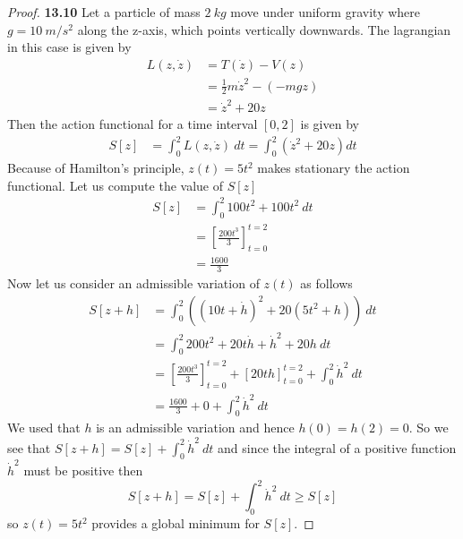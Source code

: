 \documentclass[11pt]{article}
\theoremstyle{definition}
\begin{document}
\begin{proof}{\textbf{13.10}}
    Let a particle of mass $2~kg$ move under uniform gravity where
    $g = 10~m/s^2$ along the z-axis, which points vertically downwards.
    The lagrangian in this case is given by
    \begin{align*}
        L(z, \dot{z}) &= T(\dot{z}) - V(z)\\
            &= \frac{1}{2}m\dot{z}^2 - (- mgz)\\
            &= \dot{z}^2 + 20z
    \end{align*}
    Then the action functional for a time interval $[0,2]$ is given by
    \begin{align*}
        S[z] &= \int_0^2 L(z, \dot{z})~dt
            = \int_0^2 (\dot{z}^2 + 20z) dt
    \end{align*}
    Because of Hamilton's principle, $z(t) = 5t^2$ makes stationary the
    action functional. Let us compute the value of $S[z]$
    \begin{align*}
        S[z] &= \int_0^2 100t^2 + 100t^2~dt\\
            &= \left[\frac{200t^3}{3}\right]_{t=0}^{t=2}\\
            &= \frac{1600}{3}
    \end{align*}
    Now let us consider an admissible variation of $z(t)$ as follows
    \begin{align*}
        S[z + h] &= \int_0^2 ((10t + \dot h)^2 + 20(5t^2 + h))~dt\\
            &= \int_0^2 200t^2 + 20t\dot h + \dot h^2 + 20h~dt\\
            &= \left[\frac{200t^3}{3}\right]_{t=0}^{t=2}
            + [20th]_{t=0}^{t=2} + \int_0^2 \dot h^2~dt\\
            &= \frac{1600}{3} + 0 + \int_0^2 \dot h^2~dt
    \end{align*}
    We used that $h$ is an admissible variation and hence $h(0)=h(2)=0$.
    So we see that $S[z + h] = S[z] + \int_0^2 \dot h^2~dt$ and since 
    the integral of a positive function $\dot h^2$ must be positive then
    $$S[z + h] = S[z] + \int_0^2 \dot h^2~dt \geq S[z]$$
    so $z(t) = 5t^2$ provides a global minimum for $S[z]$.
\end{proof}
\cleardoublepage
\end{document}
